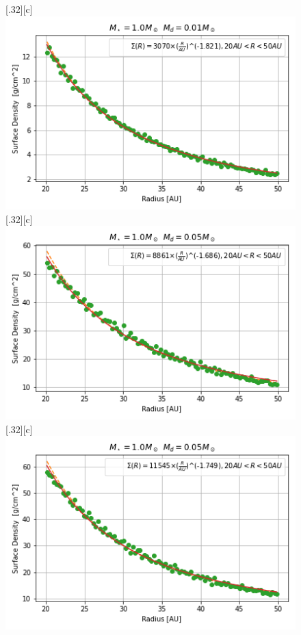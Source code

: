 \documentclass[aps,prb,twocolumn,superscriptaddress,floatfix,longbibliography]{revtex4-2}
\begin{document}
\begin{appendices}
\begin{figure}[!htbp]
  \subcaptionbox*{}[.32\linewidth][c]{%
    \includegraphics[width=\linewidth]{Graphs_1D/r_1s_0.01d_0.7q_1D.png}}\quad
  \subcaptionbox*{}[.32\linewidth][c]{%
    \includegraphics[width=\linewidth]{Graphs_1D/r_1s_0.05d_0.3q_1D.png}}\quad
  \subcaptionbox*{}[.32\linewidth][c]{%
    \includegraphics[width=\linewidth]{Graphs_1D/r_1s_0.05d_0.5q_1D.png}}\quad

\end{figure}
\end{appendices}
\end{document}
